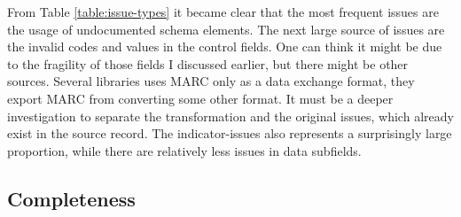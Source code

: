 From Table \ref{table:issue-types} it became clear that the most frequent issues are the usage of undocumented schema elements. The next large source of issues are the invalid codes and values in the control fields. One can think it might be due to the fragility of those fields I discussed earlier, but there might be other sources. Several libraries uses MARC only as a data exchange format, they export MARC from converting some other format. It must be a deeper investigation to separate the transformation and the original issues, which already exist in the source record. The indicator-issues also represents a surprisingly large proportion, while there are relatively less issues in data subfields.   

\subsection{Completeness}

